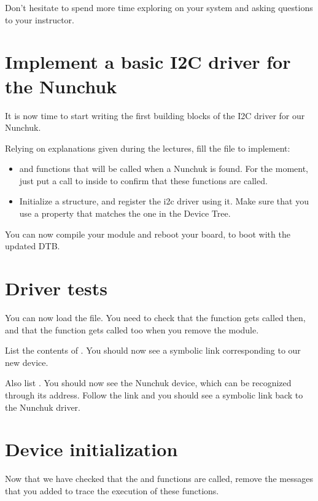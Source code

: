 Don't hesitate to spend more time exploring  on your system
and asking questions to your instructor.

\section{Implement a basic I2C driver for the Nunchuk}

It is now time to start writing the first building blocks of the I2C
driver for our Nunchuk.

Relying on explanations given during the lectures, fill the
 file to implement:

\begin{itemize}
\item {} and  functions that will
      be called when a Nunchuk is found.
      For the moment, just put a call to  inside
      to confirm that these functions are called.
\item Initialize a  structure, and register
      the i2c driver using it. Make sure that you use
      a  property that matches the one in the
      Device Tree.
\end{itemize}

You can now compile your module and reboot your board, to
boot with the updated DTB.

\section{Driver tests}

You can now load the  file.
You need to check that the  function gets called
then, and that the  function gets called too
when you remove the module.

List the contents of . You
should now see a symbolic link corresponding to our new device.

Also list . You should now see the
Nunchuk device, which can be recognized through its  address.
Follow the link and you should see a symbolic link back to the Nunchuk
driver.

\section{Device initialization}

Now that we have checked that the  and 
functions are called, remove the messages that you added to trace the
execution of these functions.

